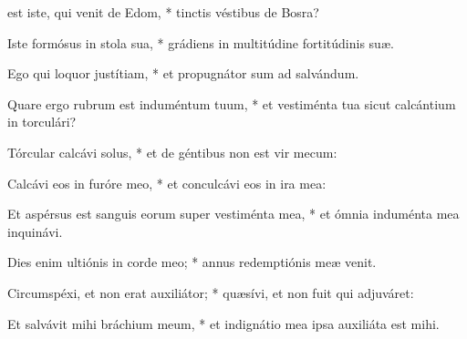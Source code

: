 \begin{psalmus}

 est iste, qui venit de Edom, * tinctis véstibus de Bosra?

Iste formósus in stola sua, * grádiens in multitúdine fortitúdinis suæ.

Ego qui loquor justítiam, * et propugnátor sum ad salvándum.

Quare ergo rubrum est induméntum tuum, * et vestiménta tua sicut calcántium in torculári?

Tórcular calcávi solus, * et de géntibus non est vir mecum:

Calcávi eos in furóre meo, * et conculcávi eos in ira mea:

Et aspérsus est sanguis eorum super vestiménta mea, * et ómnia induménta mea inquinávi.

Dies enim ultiónis in corde meo; * annus redemptiónis meæ venit.

Circumspéxi, et non erat auxiliátor; * quæsívi, et non fuit qui adjuváret:

Et salvávit mihi bráchium meum, * et indignátio mea ipsa auxiliáta est mihi.

\end{psalmus}
